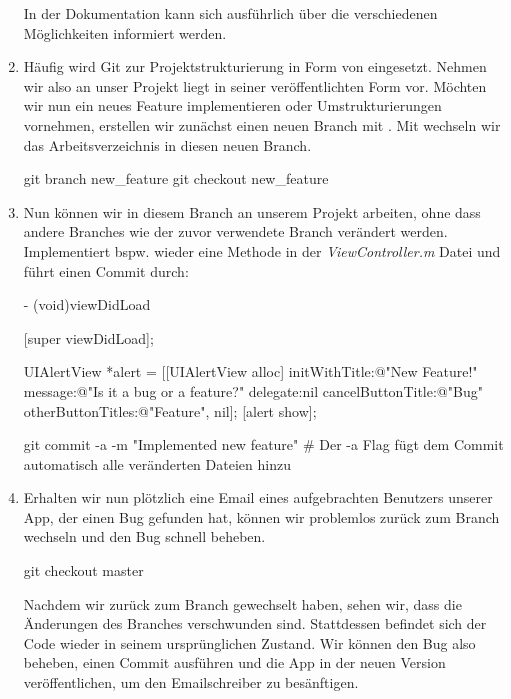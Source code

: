 \documentclass[parskip=half, final]{scrreprt}
\begin{document}
\begin{lecture}
\begin{enumerate}
In der Dokumentation  kann sich ausführlich über die verschiedenen Möglichkeiten informiert werden.

\item Häufig wird Git zur Projektstrukturierung in Form von  eingesetzt. Nehmen wir also an unser Projekt liegt in seiner veröffentlichten Form vor. Möchten wir nun ein neues Feature implementieren oder Umstrukturierungen vornehmen, erstellen wir zunächst einen neuen Branch mit . Mit  wechseln wir das Arbeitsverzeichnis in diesen neuen Branch.

\begin{shlst}
git branch new_feature
git checkout new_feature
\end{shlst}

\item Nun können wir in diesem Branch an unserem Projekt arbeiten, ohne dass andere Branches wie der zuvor verwendete  Branch verändert werden. Implementiert bspw. wieder eine  Methode in der \emph{ViewController.m} Datei und führt einen Commit durch:

\begin{objclst}
- (void)viewDidLoad {
    [super viewDidLoad];
    
    UIAlertView *alert = [[UIAlertView alloc] initWithTitle:@"New Feature!" message:@"Is it a bug or a feature?" delegate:nil cancelButtonTitle:@"Bug" otherButtonTitles:@"Feature", nil];
    [alert show];
}
\end{objclst}

\begin{shlst}
git commit -a -m "Implemented new feature" # Der -a Flag fügt dem Commit automatisch alle veränderten Dateien hinzu
\end{shlst}

\item Erhalten wir nun plötzlich eine Email eines aufgebrachten Benutzers unserer App, der einen Bug gefunden hat, können wir problemlos zurück zum  Branch wechseln und den Bug schnell beheben.

\begin{shlst}
git checkout master
\end{shlst}

Nachdem wir zurück zum  Branch gewechselt haben, sehen wir, dass die Änderungen des  Branches verschwunden sind. Stattdessen befindet sich der Code wieder in seinem ursprünglichen Zustand. Wir können den Bug also beheben, einen Commit ausführen und die App in der neuen Version veröffentlichen, um den Emailschreiber zu besänftigen.


\end{enumerate}
\end{lecture}
\end{document}
